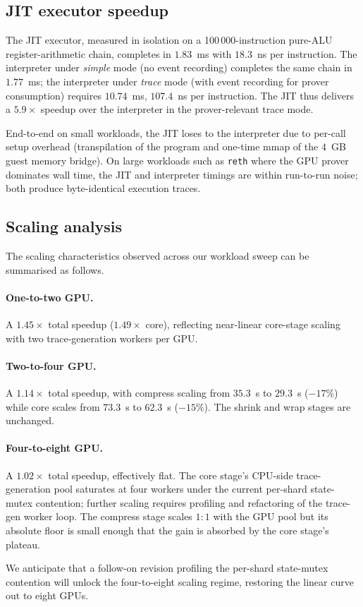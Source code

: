 \subsection{JIT executor speedup}

The JIT executor, measured in isolation on a 100\,000-instruction pure-ALU register-arithmetic chain, completes in $1.83$~ms with $18.3$~ns per instruction. The interpreter under \emph{simple} mode (no event recording) completes the same chain in $1.77$~ms; the interpreter under \emph{trace} mode (with event recording for prover consumption) requires $10.74$~ms, $107.4$~ns per instruction. The JIT thus delivers a $5.9\times$ speedup over the interpreter in the prover-relevant trace mode.

End-to-end on small workloads, the JIT loses to the interpreter due to per-call setup overhead (transpilation of the program and one-time mmap of the $4$~GB guest memory bridge). On large workloads such as \texttt{reth} where the GPU prover dominates wall time, the JIT and interpreter timings are within run-to-run noise; both produce byte-identical execution traces.

\subsection{Scaling analysis}

The scaling characteristics observed across our workload sweep can be summarised as follows.

\paragraph{One-to-two GPU.} A $1.45\times$ total speedup ($1.49\times$ core), reflecting near-linear core-stage scaling with two trace-generation workers per GPU.

\paragraph{Two-to-four GPU.} A $1.14\times$ total speedup, with compress scaling from $35.3$~s to $29.3$~s ($-17\%$) while core scales from $73.3$~s to $62.3$~s ($-15\%$). The shrink and wrap stages are unchanged.

\paragraph{Four-to-eight GPU.} A $1.02\times$ total speedup, effectively flat. The core stage's CPU-side trace-generation pool saturates at four workers under the current per-shard state-mutex contention; further scaling requires profiling and refactoring of the trace-gen worker loop. The compress stage scales $1{:}1$ with the GPU pool but its absolute floor is small enough that the gain is absorbed by the core stage's plateau.

We anticipate that a follow-on revision profiling the per-shard state-mutex contention will unlock the four-to-eight scaling regime, restoring the linear curve out to eight GPUs.
